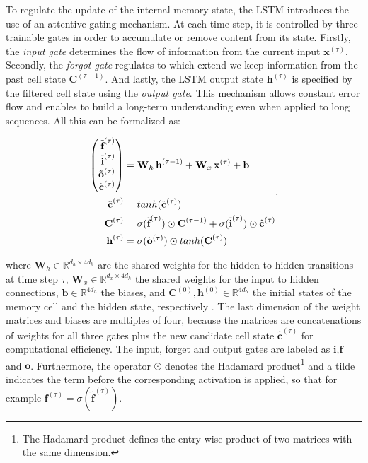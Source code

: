 To regulate the update of the internal memory state, the LSTM introduces the use of an attentive gating mechanism. At each time step, it is controlled by three trainable gates in order to accumulate or remove content from its state. Firstly, the \textit{input gate} determines the flow of information from the current input $ \textbf{x}^{(\tau)} $. Secondly, the \textit{forgot gate} regulates to which extend we keep information from the past cell state $\textbf{C}^{(\tau-1)}$. And lastly, the LSTM output state $\textbf{h}^{(\tau)}$ is specified by the filtered cell state using the \textit{output gate}. This mechanism allows constant error flow and enables to build a long-term understanding even when applied to long sequences. All this can be formalized as:

\begin{equation} \label{eq:lstm}
\begin{aligned}
\Spvek{\tilde{\textbf{f}}^{(\tau)}; \tilde{\textbf{i}}^{(\tau)}; \tilde{\textbf{o}}^{(\tau)}; \tilde{\textbf{c}}^{(\tau)}} &= \textbf{W}_{h} \, \textbf{h}^{(\tau-1)} + \textbf{W}_{x} \, \textbf{x}^{(\tau)} + \textbf{b} \\
\hat{\textbf{c}}^{(\tau)} &= tanh(\tilde{\textbf{c}}^{(\tau)}) \\
\textbf{C}^{(\tau)} &= \sigma(\tilde{\textbf{f}}^{(\tau)}) \odot \textbf{C}^{(\tau-1)} + \sigma(\tilde{\textbf{i}}^{(\tau)}) \odot \hat{\textbf{c}}^{(\tau)} \\
\textbf{h}^{(\tau)} &= \sigma(\tilde{\textbf{o}}^{(\tau)}) \odot tanh(\textbf{C}^{(\tau)})
\end{aligned} ,
\end{equation}

where $ \textbf{W}_h \in \mathbb{R}^{d_h \times 4d_h} $ are the shared weights for the hidden to hidden transitions at time step $ \tau $, $ \textbf{W}_x \in \mathbb{R}^{d_x \times 4d_h} $ the shared weights for the input to hidden connections, $ \textbf{b} \in \mathbb{R}^{4d_h} $ the biases, and $ \textbf{C}^{(0)}, \textbf{h}^{(0)} \in \mathbb{R}^{4d_h} $ the initial states of the memory cell and the hidden state, respectively \parencite{rnn-batchnorm}. The last dimension of the weight matrices and biases are multiples of four, because the matrices are concatenations of weights for all three gates plus the new candidate cell state $ \hat{\textbf{c}}^{(\tau)} $ for computational efficiency. The input, forget and output gates are labeled as $ \textbf{i}, \textbf{f} $ and $ \textbf{o} $. Furthermore, the operator $ \odot $ denotes the Hadamard product\footnote{The Hadamard product defines the entry-wise product of two matrices with the same dimension.} and a tilde indicates the term before the corresponding activation is applied, so that for example $ \textbf{f}^{(\tau)} = \sigma(\tilde{\textbf{f}}^{(\tau)}) $.


